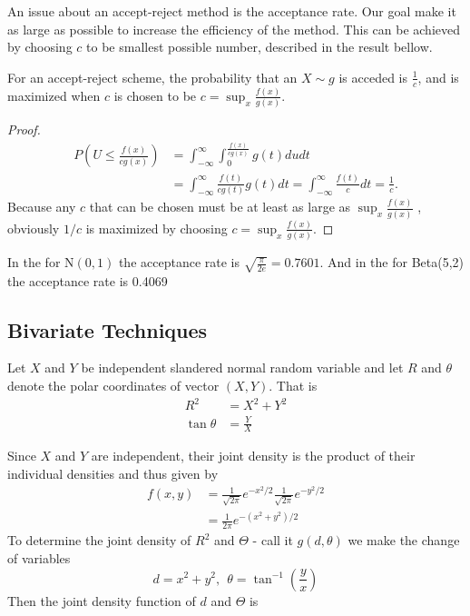 An issue about an accept-reject method is the acceptance rate.
Our goal make it as large as possible to increase the efficiency of the method.
This can be achieved by choosing $c$ to be smallest possible number, described in the result bellow.
\begin{theorem}
	For an accept-reject scheme, the probability that an $X\sim g$ is acceded is  $\frac{1}{c}$,
	and is maximized when $c$ is chosen to be $c=\sup_x\frac{f(x)}{g(x)}.$
\end{theorem}
\begin{proof}
	\begin{align*}
		P\left( U \le \frac{f(x)}{cg(x)} \right) & = \int_{-\infty}^{\infty} \int_{0}^{\frac{f(x)}{cg(x)}} g(t) du dt                                           \\
		                                         & = \int_{-\infty}^{\infty} \frac{f(t)}{cg(t)}g(t)dt = \int_{-\infty}^{\infty} \frac{f(t)}{c}dt = \frac{1}{c}.
	\end{align*}
	Because any $c$ that can be chosen must be at least as large as $\sup_x\frac{f(x)}{g(x)}$
	, obviously $1/c$ is maximized by choosing $c=\sup_x\frac{f(x)}{g(x)}.$
\end{proof}

In the  for $\text{N}(0,1)$ the acceptance rate is $\sqrt{\frac{\pi}{2 e}} = 0.7601$.
And in the  for Beta(5,2) the acceptance rate is 0.4069

\subsection{Bivariate Techniques}
Let $X$ and $Y$ be independent slandered normal random variable and let $R$ and $\theta$
denote the polar coordinates of vector $(X,Y)$. That is
\begin{align*}
	R^{2}       & = X^{2} + Y^2 \\
	\tan \theta & = \frac{Y}{X}
\end{align*}

Since $X$ and $Y$ are independent, their joint density is the product of their individual densities and thus given by
\begin{align*}
	f(x,y) & = \frac{1}{\sqrt{2\pi}} e^{-x^{2}/2 } \frac{1}{\sqrt{2\pi}} e^{-y^{2}/2 } \\
	       & = \frac{1}{2\pi} e^{-(x^{2}+y^{2})/2}
\end{align*}
To determine the joint density of $R^{2} $ and $\Theta$ - call it $g(d,\theta)$ we make the change of variables
\[
	d=x^{2}+y^{2}, \ \  \theta=\tan^{-1}\left( \frac{y}{x} \right)
\]
Then the joint density function of $d $ and $\Theta$ is

